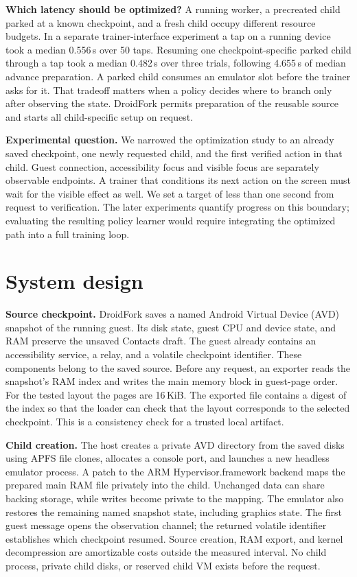 \documentclass[11pt,letterpaper]{article}
\newcommand{\subhead}[1]{\par\smallskip\noindent\textbf{#1}\enspace}
\begin{document}
\subhead{Which latency should be optimized?}
A running worker, a precreated child parked at a known checkpoint, and a fresh child occupy different resource budgets. In a separate trainer-interface experiment a tap on a running device took a median 0.556\,s over 50 taps. Resuming one checkpoint-specific parked child through a tap took a median 0.482\,s over three trials, following 4.655\,s of median advance preparation. A parked child consumes an emulator slot before the trainer asks for it. That tradeoff matters when a policy decides where to branch only after observing the state. DroidFork permits preparation of the reusable source and starts all child-specific setup on request.

\subhead{Experimental question.}
We narrowed the optimization study to an already saved checkpoint, one newly requested child, and the first verified action in that child. Guest connection, accessibility focus and visible focus are separately observable endpoints. A trainer that conditions its next action on the screen must wait for the visible effect as well. We set a target of less than one second from request to verification. The later experiments quantify progress on this boundary; evaluating the resulting policy learner would require integrating the optimized path into a full training loop.

\clearpage
\section{System design}
\subhead{Source checkpoint.}
DroidFork saves a named Android Virtual Device (AVD) snapshot of the running guest. Its disk state, guest CPU and device state, and RAM preserve the unsaved Contacts draft. The guest already contains an accessibility service, a relay, and a volatile checkpoint identifier. These components belong to the saved source. Before any request, an exporter reads the snapshot's RAM index and writes the main memory block in guest-page order. For the tested layout the pages are 16\,KiB. The exported file contains a digest of the index so that the loader can check that the layout corresponds to the selected checkpoint. This is a consistency check for a trusted local artifact.

\subhead{Child creation.}
The host creates a private AVD directory from the saved disks using APFS file clones, allocates a console port, and launches a new headless emulator process. A patch to the ARM Hypervisor.framework backend maps the prepared main RAM file privately into the child. Unchanged data can share backing storage, while writes become private to the mapping. The emulator also restores the remaining named snapshot state, including graphics state. The first guest message opens the observation channel; the returned volatile identifier establishes which checkpoint resumed. Source creation, RAM export, and kernel decompression are amortizable costs outside the measured interval. No child process, private child disks, or reserved child VM exists before the request.
\end{document}
